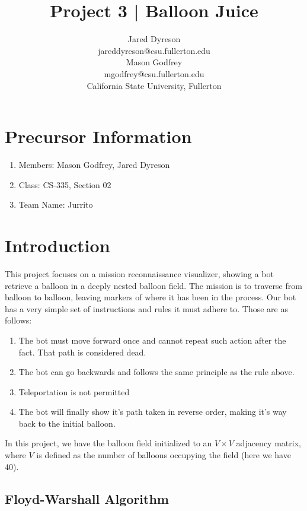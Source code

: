 \documentclass{article}
\title{Project 3 | Balloon Juice}
\author{Jared Dyreson \\
        jareddyreson@csu.fullerton.edu \\
        Mason Godfrey \\
        mgodfrey@csu.fullerton.edu \\
        California State University, Fullerton}
\date
\begin{document}
\maketitle
\tableofcontents

\newpage

\section{Precursor Information}

\begin{enumerate}
\item Members: Mason Godfrey, Jared Dyreson
\item Class: CS-335, Section 02
\item Team Name: Jurrito
\end{enumerate}

\section{Introduction}

This project focuses on a mission reconnaissance visualizer, showing a bot retrieve a balloon in a deeply nested balloon field.
The mission is to traverse from balloon to balloon, leaving markers of where it has been in the process.
Our bot has a very simple set of instructions and rules it must adhere to.
Those are as follows:

\begin{enumerate}
\item The bot must move forward once and cannot repeat such action after the fact. That path is considered dead.
\item The bot can go backwards and follows the same principle as the rule above.
\item Teleportation is not permitted
\item The bot will finally show it's path taken in reverse order, making it's way back to the initial balloon.
\end{enumerate}

\begin{flushleft}
In this project, we have the balloon field initialized to an $V \times V$ adjacency matrix, where $V$ is defined as the number of balloons occupying the field (here we have 40).
\end{flushleft}

\subsection{Floyd-Warshall Algorithm}
\end{document}
